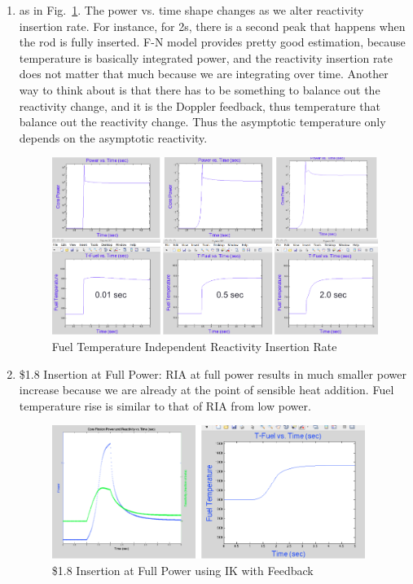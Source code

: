 \documentclass{school-22.211-notes}
\begin{document}
\clearpage
{}
\begin{enumerate}
\item {} as in Fig.~\ref{fn2}. The power vs. time shape changes as we alter reactivity insertion rate. For instance, for 2s, there is a second peak that happens when the rod is fully inserted.  F-N model provides pretty good estimation, because temperature is basically integrated power, and the reactivity insertion rate does not matter that much because we are integrating over time. Another way to think about is that there has to be something to balance out the reactivity change, and it is the Doppler feedback, thus temperature that balance out the reactivity change. Thus the asymptotic temperature only depends on the asymptotic reactivity. 

  \begin{figure}[ht] 
    \centering
    \includegraphics[width=7in]{images/pke/fn2.png}
    \caption{Fuel Temperature Independent Reactivity Insertion Rate} \label{fn2}
  \end{figure}

\item \$1.8 Insertion at Full Power: RIA at full power results in much smaller power increase because we are already at the point of sensible heat addition. Fuel temperature rise is similar to that of RIA from low power. 
  \begin{figure}[ht] 
    \centering
    \includegraphics[width=4in]{images/pke/fn3.png}
    \caption{\$1.8 Insertion at Full Power using IK with Feedback}
  \end{figure}


\end{enumerate}
\end{document}
